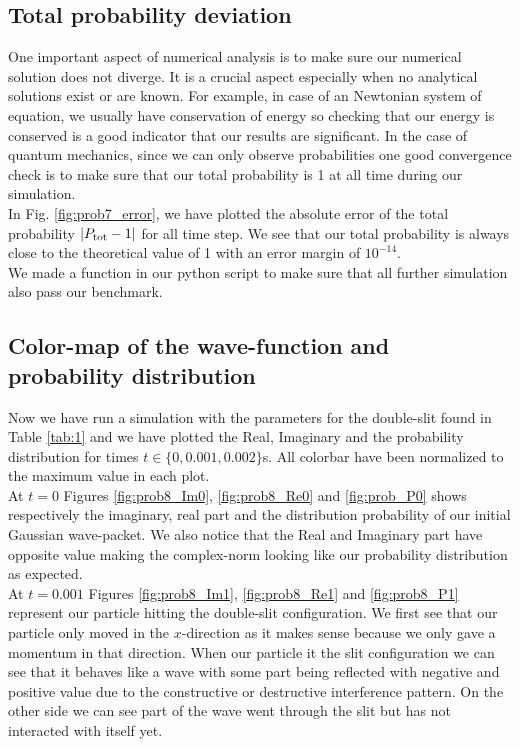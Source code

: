 \documentclass[english,notitlepage,reprint,nofootinbib]{revtex4-2}  %
\begin{document}
	\subsection{Total probability deviation} \label{subsec:tot_prob_dev}
	
	One important aspect of numerical analysis is to make sure our numerical
	solution does not diverge. It is a crucial aspect especially when no 
	analytical solutions exist or are known. For example, in case of an 
	Newtonian system of equation, we usually have conservation of energy
	so checking that our energy is conserved is a good indicator that our
	results are significant. In the case of quantum mechanics, since we 
	can only observe probabilities one good convergence check is to make sure
	that our total probability is 1 at all time during our simulation. \\
	
	In Fig.	\ref{fig:prob7_error}, we have plotted the absolute error of 
	the total probability $|P_{\rm tot} - 1|$ for all time step. 
	We see that our total probability is always close to the theoretical 
	value of 1 with an error margin of $10^{-14}$.  \\
	
	We made a function in our python script to make sure that all further 
	simulation also pass our benchmark. 
	
	\subsection{Color-map of the wave-function and probability distribution}\label{subsec:colormap}
	
	Now we have run a simulation with the parameters for the double-slit found in
	Table \ref{tab:1} and we have plotted the Real, Imaginary and the probability
	distribution for times $t \in \{0, 0.001, 0.002 \}$s. All colorbar have been 
	normalized to the maximum value in each plot. \\
	
	At $t=0$ Figures \ref{fig:prob8_Im0}, \ref{fig:prob8_Re0} and \ref{fig:prob_P0}
	shows respectively the imaginary, real part and the distribution probability 
	of our initial Gaussian wave-packet. We also notice that the Real and Imaginary 
	part have opposite value making the complex-norm looking like our probability
	distribution as expected. \\
	
	At $t=0.001$ Figures \ref{fig:prob8_Im1}, \ref{fig:prob8_Re1} and \ref{fig:prob8_P1}
	represent our particle hitting the double-slit configuration. We first see that our 
	particle only moved in the $x$-direction as it makes sense because we only gave a 
	momentum in that direction. When our particle it the slit configuration we can see 
	that it behaves like a wave with some part being reflected with negative and positive 
	value due to the constructive or destructive interference pattern. On the other side
	we can see part of the wave went through the slit but has not interacted with itself 
	yet. \\ 
	
\end{document}
